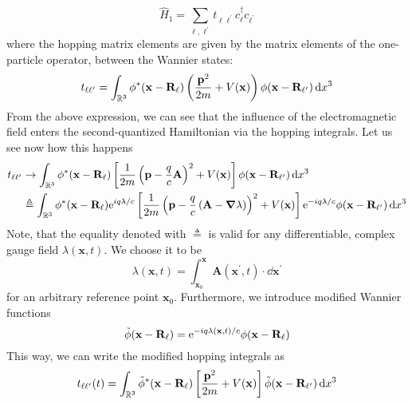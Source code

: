 \begin{equation}
    \hat{H} _{1} = \sum_{\ell,\ell^{\prime} } t_{\ell\ell^{\prime}} c^{\dag}_{\ell}c_{\ell^{\prime}}
\end{equation}
where the hopping matrix elements are given by the matrix elements of the one-particle operator,
between the Wannier states:
\begin{equation}
    t_{\ell\ell^{\prime}} = \int_{\mathbb{R}^3} \phi^{*}(\mathbf{x} - \mathbf{R}_{\ell})
    \left(\frac{\mathbf{p}^{2}}{2m} + V(\mathbf{x} )\right)\phi(\mathbf{x} - \mathbf{R}_{\ell^{\prime}}) \dd{x^3}
\end{equation}
From the above expression, we can see that the influence of the electromagnetic field enters the second-quantized
Hamiltonian via the hopping integrals. Let us see now how this happens
\begin{align}
    t_{\ell\ell^{\prime}} & \to \int_{\mathbb{R}^3}  \phi^{*}(\mathbf{x} - \mathbf{R}_{\ell})
    \left[\frac{1}{2m}\left( \mathbf{p} - \frac{q}{c} \mathbf{A}  \right)^2  + V(\mathbf{x} )\right]
    \phi(\mathbf{x} - \mathbf{R}_{\ell^{\prime}})\dd{x^3} \nonumber                                                \\
                          & \triangleq \int_{\mathbb{R}^3} \phi^{*}(\mathbf{x} - \mathbf{R}_{\ell}) \mathrm{e}^{i q \lambda / c}
    \left[\frac{1}{2m}\left( \mathbf{p} - \frac{q}{c} \left( \mathbf{A} - \grad{\lambda } \right)   \right)^2  + V(\mathbf{x} )\right]
    \mathrm{e}^{-i q \lambda / c} \phi(\mathbf{x} - \mathbf{R}_{\ell^{\prime}}) \dd{x^3}
\end{align}
Note, that the equality denoted with \(\triangleq \) is valid for any differentiable, complex gauge field \(\lambda (\mathbf{x},t)\).
We choose it to be
\begin{equation}
    \lambda (\mathbf{x},t) =  \int_{\mathbf{x}_0 }^{\mathbf{x}} \mathbf{A}(\mathbf{x}^{\prime},t) \cdot \dd{\mathbf{x}^{\prime}}
\end{equation}
for an arbitrary reference point \(\mathbf{x}_0 \). Furthermore, we introduce modified Wannier functions
\begin{equation}
    \Tilde{\phi}(\mathbf{x} - \mathbf{R}_{\ell}) = \mathrm{e}^{-i q \lambda(\mathbf{x} ,t) / c} \phi(\mathbf{x} - \mathbf{R}_{\ell})
\end{equation}
This way, we can write the modified hopping integrals as
\begin{equation}
    {t}_{\ell\ell^{\prime}}(t) = \int_{\mathbb{R}^3}  \Tilde{\phi}^{*}(\mathbf{x} - \mathbf{R}_{\ell})
    \left[\frac{\mathbf{p}^2}{2m}  + V(\mathbf{x} )\right]
    \Tilde{\phi}(\mathbf{x} - \mathbf{R}_{\ell^{\prime}})\dd{x^3}
\end{equation}
